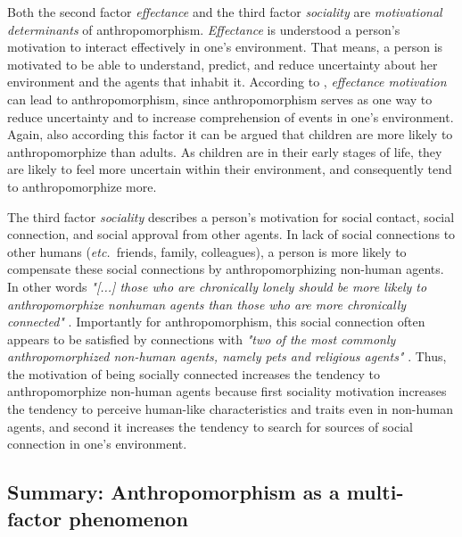 \documentclass{frontiersSCNS} %
\newcommand{\etc}{{\textit{etc.~}}}
\begin{document}
Both the second factor \textit{effectance} and the third factor
\textit{sociality} are \emph{motivational determinants} of anthropomorphism.
\textit{Effectance} is understood a person's motivation to interact effectively
in one's environment. That means, a person is motivated to be able to
understand, predict, and reduce uncertainty about her environment and the agents
that inhabit it. According to \cite{epley_seeing_2007}, \textit{effectance
motivation} can lead to anthropomorphism, since anthropomorphism serves as one
way to reduce uncertainty and to increase comprehension of events in one's
environment. Again, also according this factor it can be argued that children
are more likely to anthropomorphize than adults. As children are in their early
stages of life, they are likely to feel more uncertain within their environment,
and consequently tend to anthropomorphize more.

The third factor \textit{sociality} describes a person's motivation for social contact, social connection, and social approval from other agents. In lack of social connections to other humans (\etc friends, family, colleagues), a person is more likely to compensate these social connections by anthropomorphizing non-human agents. In other words \textit{"[...] those who are chronically lonely should be more likely to anthropomorphize nonhuman agents than those who are more chronically connected"} \citep{epley_seeing_2007}. Importantly for anthropomorphism, this social connection often appears to be satisfied by connections with \textit{"two of the most commonly anthropomorphized non-human agents, namely pets and religious agents"} \citep{epley_seeing_2007}. Thus, the motivation of being socially connected increases the tendency to anthropomorphize non-human agents because first sociality motivation increases the tendency to perceive human-like characteristics and traits even in non-human agents, and second it increases the tendency to search for sources of social connection in one's environment.



  

%
%
%
%
%
%



\subsection{Summary: Anthropomorphism as a multi-factor phenomenon}
\label{sec:multi-factors}
\end{document}
